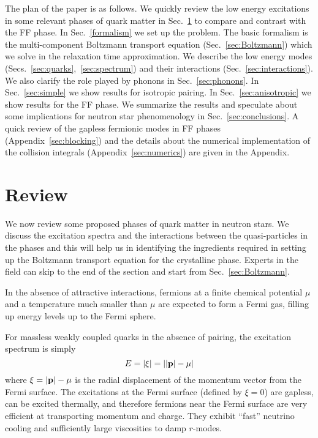 \documentclass[10pt, aps, prd, superscriptaddress, nofootinbib, 
               amsmath, amssymb, twocolumn,
               preprintnumbers, showpacs,
               raggedbottom,
               floatfix]{revtex4-1}
\begin{document}
The plan of the paper is as follows. We quickly review the low energy
excitations in some relevant phases of quark matter in Sec.~\ref{sec:review} to
compare and contrast with the FF phase. In Sec.~\ref{formalism} we set up the
problem. The basic formalism is the multi-component Boltzmann transport
equation (Sec.~\ref{sec:Boltzmann}) which we solve in the relaxation time
approximation. We describe the low energy modes
(Secs.~\ref{sec:quarks},~\ref{sec:spectrum}) and their interactions
(Sec.~\ref{sec:interactions}). We also clarify the role played by phonons in
Sec.~\ref{sec:phonons}. In Sec.~\ref{sec:simple} we show results for isotropic
pairing. In Sec.~\ref{sec:anisotropic} we show results for the FF phase.  We
summarize the results and speculate about some implications for neutron star
phenomenology in Sec.~\ref{sec:conclusions}. A quick review of the gapless
fermionic modes in FF phases (Appendix~\ref{sec:blocking}) and the details
about the numerical implementation of the collision integrals
(Appendix~\ref{sec:numerics}) are given in the Appendix. 

\section{Review}
\label{sec:review}
We now review some proposed phases of quark matter in neutron stars.  We
discuss the excitation spectra and the interactions between the quasi-particles
in the phases and this will help us in identifying the ingredients required in
setting up the Boltzmann transport equation for the crystalline phase. Experts
in the field can skip to the end of the section and start from
Sec.~\ref{sec:Boltzmann}.

In the absence of attractive interactions, fermions at a finite chemical
potential $\mu$ and a temperature much smaller than $\mu$ are expected to
form a Fermi gas, filling up energy levels up to the Fermi sphere.

For massless weakly coupled quarks in the absence of pairing, the excitation spectrum is simply
\begin{equation}
E=|\xi|=||{\bf{p}}|-\mu|
\end{equation}
where $\xi=|{\bf{p}}|-\mu$ is the radial displacement of the momentum vector
from the Fermi surface. The excitations at the Fermi surface (defined by
$\xi=0$) are gapless, can be excited thermally, and therefore fermions near the
Fermi surface are very efficient at transporting momentum and charge. They
exhibit ``fast'' neutrino cooling and sufficiently large viscosities to damp
$r$-modes.
\end{document}

